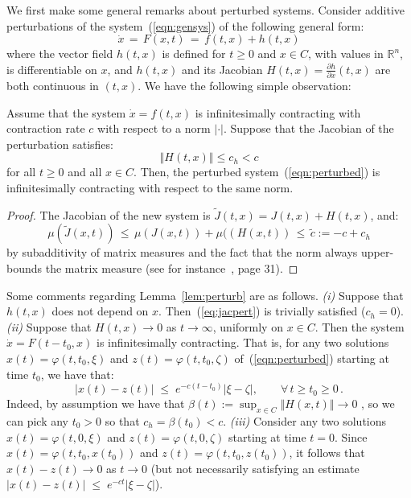\documentclass{svmult}
\newcommand{\opteqn}[1]{$#1$}
\newcommand{\mysubsection}[1]{\smallskip\noindent{\bf \emph{#1}.}}
\newcommand{\R}{{\mathbb R}}  %
\newcommand{\abs}[1]{\left\vert #1 \right\vert}
\newcommand{\norm}[1]{\left\Vert #1 \right\Vert}
\newcommand{\be}[1]{\begin{equation}\label{#1}}
\newcommand{\ee}{\end{equation}}
\newcommand{\cc}{c}
\newcommand{\absv}[1]{\left\vert #1 \right\vert}
\begin{document}
\mysubsection{Proof of Theorem~\protect{\ref{theo:fhc}}}
We first make some general remarks about perturbed systems.
Consider additive perturbations of the system~(\ref{eqn:gensys}) of the
following general form:
\be{eqn:perturbed}
\dot x \,=\, F(x,t) \,=\, f(t,x) + h(t,x)
\ee
where the vector field $h(t,x)$ is defined for $t\geq 0$ and $x\in C$, with values
in $\R^n$, is differentiable on $x$, and $h(t,x)$ and its Jacobian $H(t,x) =
\frac{\partial h}{\partial x}(t,x)$ are both continuous in $(t,x)$.
We have the following simple observation:

\begin{lemma}
\label{lem:perturb}
Assume that the system $\dot x=f(t,x)$ is infinitesimally contracting with
contraction rate $\cc$ with respect to a norm $\absv{\cdot }$.
Suppose that the Jacobian of the perturbation satisfies:
\be{eq:jacpert}
\norm{H(t,x)} \leq  c_h < c
\ee
for all $t\geq 0$ and all $x\in C$.
Then, the perturbed system~(\ref{eqn:perturbed})
is infinitesimally contracting with respect to the same norm.
\end{lemma}

\begin{proof}
The Jacobian of the new system is $\widetilde J(t,x) = J(t,x)+H(t,x)$, and:
\[
\mu (\widetilde J(x,t))
\,\leq \,
\mu \left(J\left(x,t\right)\right) +
\mu (\left(H\left(x,t\right)\right)
\,\leq \,
\widetilde c := -c + c_h
\]
by subadditivity of matrix measures and the fact that the norm always
upper-bounds the matrix measure (see for
instance~\cite{desoer-vidyasagar-siam}, page 31).
\end{proof}

Some comments regarding Lemma~\ref{lem:perturb} are as follows.
\emph{(i)}
Suppose that $h(t,x)$ does not depend on $x$.  Then~(\ref{eq:jacpert})
is trivially satisfied ($c_h=0$).
\emph{(ii)}
Suppose that
\opteqn{
H(t,x) \rightarrow  0
}
as $t\rightarrow \infty $, uniformly on $x\in C$.
Then the system $\dot x=F(t-t_0,x)$ is infinitesimally contracting.
That is, for any
two solutions $x(t)=\varphi(t,t_0,\xi )$ and $z(t)=\varphi(t,t_0,\zeta )$ 
of~(\ref{eqn:perturbed}) starting at time $t_0$, we have that:
\[
\abs{x(t)-z(t)} \;\leq \; e^{-\cc (t-t_0)} \abs{\xi -\zeta }, 
\quad\quad\forall\,t\ge t_0\geq 0\,.
\]
Indeed, by assumption we have that
$\beta (t) := \sup_{x\in C}\norm{H\left(x,t\right)} \rightarrow 0$ ,
so we can pick any $t_0>0$ so that $c_h=\beta (t_0)<c$.
\emph{(iii)}
Consider any two solutions $x(t)=\varphi(t,0,\xi )$ and
$z(t)=\varphi(t,0,\zeta )$ starting at time $t=0$.  Since
$x(t)=\varphi(t,t_0,x(t_0))$ and $z(t)=\varphi(t,t_0,z(t_0))$,
it follows that $x(t)-z(t)\rightarrow 0$ as $t\rightarrow 0$ (but not necessarily 
satisfying an estimate $\abs{x(t)-z(t)} \;\leq \; e^{-\cc t} \abs{\xi -\zeta }$).
\end{document}
